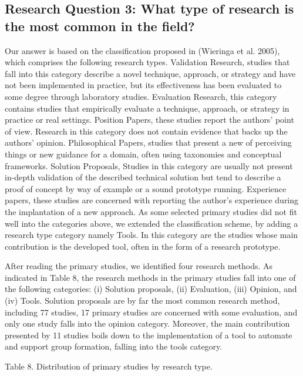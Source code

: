 \subsection{Research Question 3: What type of research is the most common in the field?}

Our answer is based on the classification proposed in (Wieringa et al. 2005), which comprises the following research types. Validation Research, studies that fall into this category describe a novel technique, approach, or strategy and have not been implemented in practice, but its effectiveness has been evaluated to some degree through laboratory studies. Evaluation Research, this category contains studies that empirically evaluate a technique, approach, or strategy in practice or real settings. Position Papers, these studies report the authors' point of view. Research in this category does not contain evidence that backs up the authors' opinion. Philosophical Papers, studies that present a new of perceiving things or new guidance for a domain, often using taxonomies and conceptual frameworks. Solution Proposals, Studies in this category are usually not present in-depth validation of the described technical solution but tend to describe a proof of concept by way of example or a sound prototype running. Experience papers, these studies are concerned with reporting the author's experience during the implantation of a new approach. As some selected primary studies did not fit well into the categories above, we extended the classification scheme, by adding a research type category namely Tools. In this category are the studies whose main contribution is the developed tool, often in the form of a research prototype. 

After reading the primary studies, we identified four research methods. As indicated in Table 8, the research methods in the primary studies fall into one of the following categories: (i) Solution proposals, (ii) Evaluation, (iii) Opinion, and (iv) Tools. Solution proposals are by far the most common research method, including 77 studies, 17 primary studies are concerned with some evaluation, and only one study falls into the opinion category. Moreover, the main contribution presented by 11 studies boils down to the implementation of a tool to automate and support group formation, falling into the tools category.

Table 8. Distribution of primary studies by research type.

